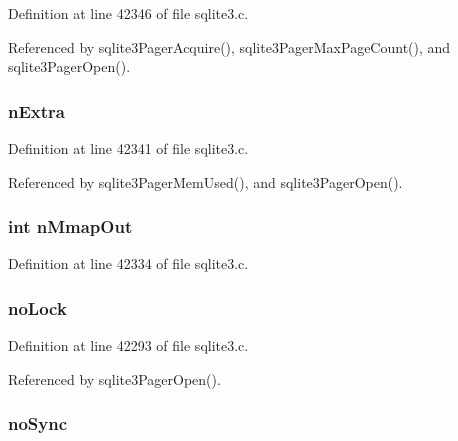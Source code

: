 Definition at line 42346 of file sqlite3.\+c.



Referenced by sqlite3\+Pager\+Acquire(), sqlite3\+Pager\+Max\+Page\+Count(), and sqlite3\+Pager\+Open().

\hypertarget{struct_pager_a20cc0a06d1046c9dd0aa2001c5c2b4f7}{}
\subsubsection[{n\+Extra}]{ n\+Extra}\label{struct_pager_a20cc0a06d1046c9dd0aa2001c5c2b4f7}


Definition at line 42341 of file sqlite3.\+c.



Referenced by sqlite3\+Pager\+Mem\+Used(), and sqlite3\+Pager\+Open().

\hypertarget{struct_pager_a534c1f10017427734ae2bab8cae2813f}{}
\subsubsection[{n\+Mmap\+Out}]{\setlength{\rightskip}{0pt plus 5cm}int n\+Mmap\+Out}\label{struct_pager_a534c1f10017427734ae2bab8cae2813f}


Definition at line 42334 of file sqlite3.\+c.

\hypertarget{struct_pager_a1374f5f38b4d4a4dd63a597f7e097610}{}
\subsubsection[{no\+Lock}]{ no\+Lock}\label{struct_pager_a1374f5f38b4d4a4dd63a597f7e097610}


Definition at line 42293 of file sqlite3.\+c.



Referenced by sqlite3\+Pager\+Open().

\hypertarget{struct_pager_aa87063f84c94b21b9d571bf858a4a697}{}
\subsubsection[{no\+Sync}]{ no\+Sync}\label{struct_pager_aa87063f84c94b21b9d571bf858a4a697}


